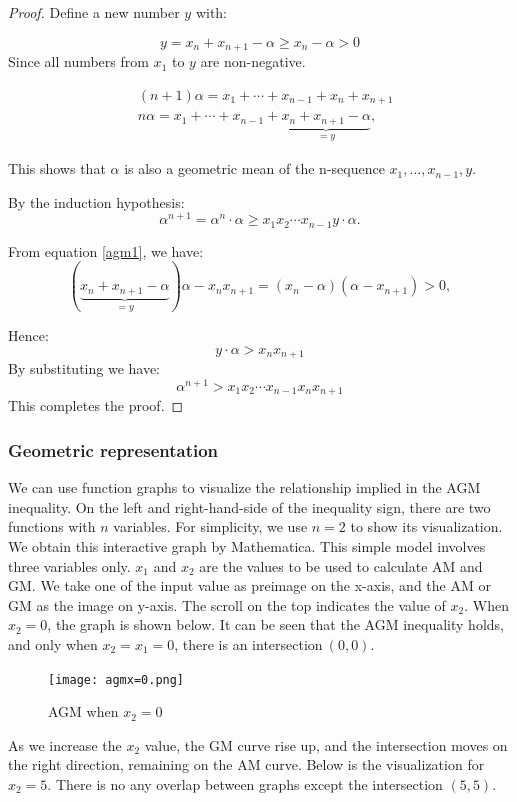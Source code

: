 \documentclass[
	12pt, %
	fleqn, %
	a4paper, %
]{LegrandOrangeBook}
\begin{document}
\begin{proof}
Define a new number \( y \) with:

\[
y = x_n + x_{n+1} - \alpha \geq x_n - \alpha > 0
\]
Since all numbers from $x_1$ to $y$  are non-negative.

$$\begin{aligned}&(n+1)\alpha=x_1+\cdots+x_{n-1}+x_n+x_{n+1}\\&n\alpha=x_1+\cdots+x_{n-1}+\underbrace{x_n+x_{n+1}-\alpha}_{=y},\end{aligned}$$

This shows that $\alpha$ is also a geometric mean of the n-sequence $x_{1},\ldots,x_{n-1},y$. 

By the induction hypothesis:
$$\alpha^{n+1}=\alpha^n\cdot\alpha\geq x_1x_2\cdots x_{n-1}y\cdot\alpha.$$

From equation \autoref{agm1}, we have:
$$(\underbrace{x_n+x_{n+1}-\alpha}_{=y})\alpha-x_nx_{n+1}=(x_n-\alpha)(\alpha-x_{n+1})>0,$$

Hence:
$$y\cdot \alpha > x_n x_{n+1}$$
By substituting we have:
$$\alpha^{n+1}>x_1x_2\cdots x_{n-1}x_nx_{n+1}$$
This completes the proof.
\end{proof}

\subsubsection*{Geometric representation}
We can use function graphs to visualize the relationship implied in the AGM inequality. On the left and right-hand-side of the inequality sign, there are two functions with $n$ variables.
For simplicity, we use $n=2$ to show its visualization.
We obtain this interactive graph by Mathematica. This simple model involves three variables only. $\displaystyle x_{1}$ and $\displaystyle x_{2}$ are the values to be used to calculate AM and GM. 
We take one of the input value as preimage on the x-axis, and the AM or GM as the image on y-axis. The scroll on the top indicates the value of $\displaystyle x_{2}$. When $\displaystyle x_{2} =0$, the 
graph is shown below. It can be seen that the AGM inequality holds, and only when $\displaystyle x_{2} =x_{1} =0$, there is an intersection$\displaystyle \ ( 0,0) .$

\begin{figure}[H]
    \centering
    \texttt{[image: agmx=0.png]}
    \caption{AGM when $x_2 = 0$}
\end{figure}

As we increase the $\displaystyle x_{2}$ value, the GM curve rise up, and the intersection moves on the right direction, remaining on the AM curve. Below is the visualization for $\displaystyle x_{2} =5$. 
There is no any overlap between graphs except the intersection $\displaystyle ( 5,5)$. 
\end{document}
